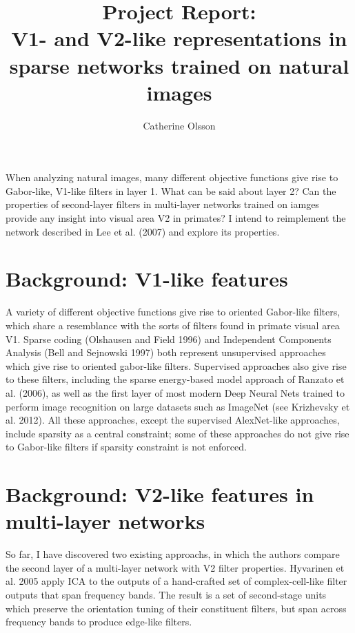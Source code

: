 \documentclass[12pt]{article}
\title{Project Report:\\ V1- and V2-like representations in sparse networks trained on natural images}
\author{Catherine Olsson}
\begin{document}
\maketitle

When analyzing natural images, many different objective functions give rise to Gabor-like, V1-like filters in layer 1. What can be said about layer 2? Can the properties of second-layer filters in multi-layer networks trained on iamges provide any insight into visual area V2 in primates? I intend to reimplement the network described in Lee et al. (2007) and explore its properties.

\section*{Background: V1-like features}
A variety of different objective functions give rise to oriented Gabor-like filters, which share a resemblance with the sorts of filters found in primate visual area V1. Sparse coding (Olshausen and Field 1996) and Independent Components  Analysis (Bell and Sejnowski 1997) both represent unsupervised approaches which give rise to oriented gabor-like filters. Supervised approaches also give rise to these filters, including the sparse energy-based model approach of Ranzato et al. (2006), as well as the first layer of most modern Deep Neural Nets trained to perform image recognition on large datasets such as ImageNet (see Krizhevsky et al. 2012). All these approaches, except the supervised AlexNet-like approaches, include sparsity as a central constraint; some of these approaches do not give rise to Gabor-like filters if sparsity constraint is not enforced.


\section*{Background: V2-like features in multi-layer networks}

So far, I have discovered two existing approachs, in which the authors compare the second layer of a multi-layer network with V2 filter properties. Hyvarinen et al. 2005 apply ICA to the outputs of a hand-crafted set of complex-cell-like filter outputs that span frequency bands. The result is a set of second-stage units which preserve the orientation tuning of their constituent filters, but span across frequency bands to produce edge-like filters. 
\end{document}
